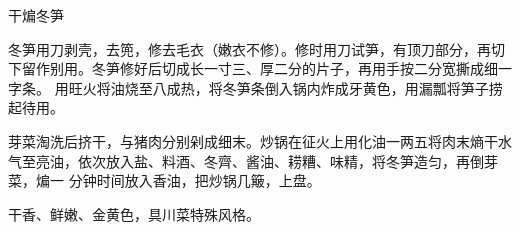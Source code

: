 \begin{recipe}{干煸冬笋}

\ingredients


\cooking

\step 冬笋用刀剥壳，去篼，修去毛衣（嫩衣不修）。修时用刀试笋，有顶刀部分，再切
下留作别用。冬笋修好后切成长一寸三、厚二分的片子，再用手按二分宽撕成细一字条。
用旺火将油烧至八成热，将冬笋条倒入锅内炸成牙黄色，用漏瓢将笋子捞起待用。

\step 芽菜淘洗后挤干，与猪肉分别剁成细末。炒锅在征火上用化油一两五将肉末熵干水
气至亮油，依次放入盐、料酒、冬齊、酱油、耢糟、味精，将冬笋造匀，再倒芽菜，煸一
分钟时间放入香油，把炒锅几簸，上盘。

\features

干香、鲜嫩、金黄色，具川菜特殊风格。

\end{recipe}

